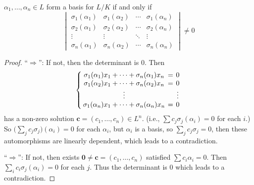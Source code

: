 \begin{lemma} \label{lemma:basis-iff-det-neq-0}
  $\alpha_1, \dots, \alpha_n \in L$ form a basis for $L/K$ if and only if
  \[
    \begin{vmatrix}
      \sigma_1(\alpha_1) & \sigma_1(\alpha_2) & \cdots & \sigma_1(\alpha_n) \\
      \sigma_2(\alpha_1) & \sigma_2(\alpha_2) & \cdots & \sigma_2(\alpha_n) \\
      \vdots & \vdots & \ddots & \vdots \\
      \sigma_n(\alpha_1) & \sigma_n(\alpha_2) & \cdots & \sigma_n(\alpha_n)
    \end{vmatrix} \neq 0
  \]

  \begin{proof}
    ``$\Rightarrow$'': If not, then the determinant is $0$. Then
    \[ \left\{
        \arraycolsep=2pt
        \begin{array}{ccc}
          \sigma_1(\alpha_1) x_1 + \dots + \sigma_n(\alpha_1) x_n &=& 0 \\
          \sigma_1(\alpha_2) x_1 + \dots + \sigma_n(\alpha_2) x_n &=& 0 \\
          \vdots & & \vdots \\
          \sigma_1(\alpha_n) x_1 + \dots + \sigma_n(\alpha_n) x_n &=& 0
        \end{array}
      \right.
    \]
    has a non-zero solution $\bm{c} = (c_1, \dots, c_n) \in L^n$. (i.e., $\sum c_j \sigma_j(\alpha_i) = 0$
    for each $i$.) So $\big( \sum_{j} c_j \sigma_j \big)(\alpha_i) = 0$ for each $\alpha_i$,
    but $\alpha_i$ is a basis, so $\sum_{j} c_j \sigma_j = 0$, then these automorphisms
    are linearly dependent, which leads to a contradiction.

    ``$\Rightarrow$'': If not, then exists $\bm{0} \neq \bm{c} = (c_1, \dots, c_n)$
    satisfied $\sum c_i \alpha_i = 0$. Then $\sum_i c_i \sigma_j(\alpha_i) = 0$
    for each $j$. Thus the determinant is $0$ which leads to a contradiction.
  \end{proof}
\end{lemma}

